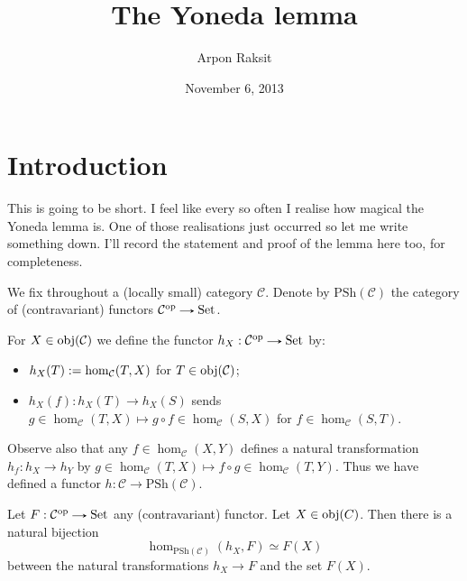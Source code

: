 

\title{The Yoneda lemma}
\author{Arpon Raksit}
\date{November 6, 2013}


\maketitle
\thispagestyle{fancy}


\renewcommand{\C}{\mathcal{C}}
\newcommand{\Set}{\mathrm{Set}}
\newcommand{\PSh}{\mathrm{PSh}}

\section{Introduction}

This is going to be short. I feel like every so often I realise how
magical the Yoneda lemma is. One of those realisations just occurred
so let me write something down. I'll record the statement and proof of
the lemma here too, for completeness.

\begin{notation}
  We fix throughout a (locally small) category $\C$. Denote by
  $\PSh(\C)$ the category of (contravariant) functors $\C^{\op} \to
  \Set$.
\end{notation}

\begin{definition}
  For $X \in \obj(\C)$ we define the functor $h_X : \C^{\op} \to \Set$
  by:
  \begin{itemize}
  \item $h_X(T) \ce \hom_\C(T,X)$ for $T \in \obj(\C)$;
  \item $h_X(f) : h_X(T) \to h_X(S)$ sends $g \in \hom_\C(T,X) \mapsto
    g \circ f \in \hom_\C(S,X)$ for $f \in \hom_\C(S,T)$.
  \end{itemize}
  Observe also that any $f \in \hom_\C(X,Y)$ defines a natural
  transformation $h_f : h_X \to h_Y$ by $g \in \hom_\C(T,X) \mapsto f
  \circ g \in \hom_\C(T,Y)$. Thus we have defined a functor $h : \C
  \to \PSh(\C)$.
\end{definition}

\begin{lemma}[Yoneda]
  Let $F : \C^{\op} \to \Set$ any (contravariant) functor. Let $X \in
  \operatorname{obj}(C)$. Then there is a natural bijection
  \[
  \hom_{\PSh(\C)}(h_X,F) \simeq F(X)
  \]
  between the natural transformations $h_X \to F$ and the set $F(X)$.
\end{lemma}

